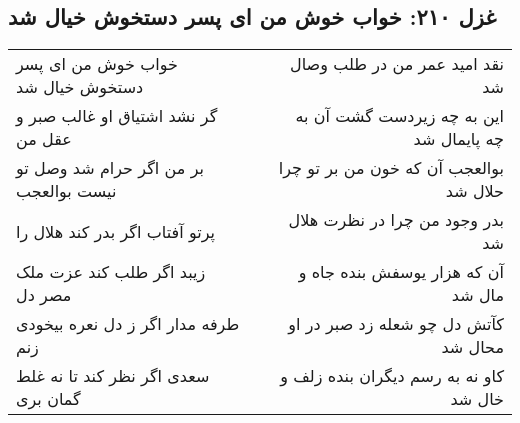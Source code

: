 \begin{center}
\section*{غزل ۲۱۰: خواب خوش من ای پسر دستخوش خیال شد}
\label{sec:210}
\begin{longtable}{l p{0.5cm} r}
خواب خوش من ای پسر دستخوش خیال شد
&&
نقد امید عمر من در طلب وصال شد
\\
گر نشد اشتیاق او غالب صبر و عقل من
&&
این به چه زیردست گشت آن به چه پایمال شد
\\
بر من اگر حرام شد وصل تو نیست بوالعجب
&&
بوالعجب آن که خون من بر تو چرا حلال شد
\\
پرتو آفتاب اگر بدر کند هلال را
&&
بدر وجود من چرا در نظرت هلال شد
\\
زیبد اگر طلب کند عزت ملک مصر دل
&&
آن که هزار یوسفش بنده جاه و مال شد
\\
طرفه مدار اگر ز دل نعره بیخودی زنم
&&
کآتش دل چو شعله زد صبر در او محال شد
\\
سعدی اگر نظر کند تا نه غلط گمان بری
&&
کاو نه به رسم دیگران بنده زلف و خال شد
\\
\end{longtable}
\end{center}
